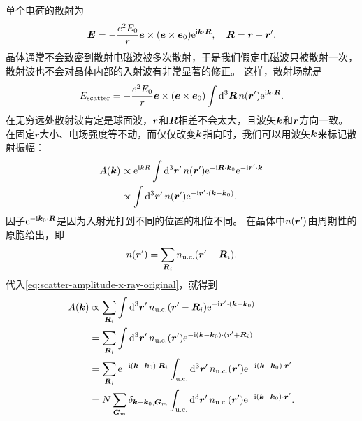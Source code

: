 单个电荷的散射为
\begin{equation}
    \vb*{E} = - \frac{e^2 E_0}{r} \vb*{e} \times (\vb*{e} \times \vb*{e}_0) \mathrm{e}^{\mathrm{i} \vb*{k} \cdot \vb*{R}}, \quad \vb*{R} = \vb*{r} - \vb*{r}'.
\end{equation}
晶体通常不会致密到散射电磁波被多次散射，于是我们假定电磁波只被散射一次，散射波也不会对晶体内部的入射波有非常显著的修正。
这样，散射场就是
\begin{equation}
    E_\text{scatter} = -\frac{e^2 E_0}{r} \vb*{e} \times (\vb*{e} \times \vb*{e}_0) \int \dd[3]{\vb*{R}} n(\vb*{r}') \mathrm{e}^{\mathrm{i} \vb*{k} \cdot \vb*{R}}.
\end{equation}
在无穷远处散射波肯定是球面波，$\vb*{r}$和$\vb*{R}$相差不会太大，且波矢$\vb*{k}$和$\vb*{r}$方向一致。
在固定$r$大小、电场强度等不动，而仅仅改变$\vb*{k}$指向时，我们可以用波矢$\vb*{k}$来标记散射振幅：
\begin{equation}
    \begin{aligned}
        A(\vb*{k}) &\propto \mathrm{e}^{\mathrm{i} k R} \int \dd[3]{\vb*{r}'} n(\vb*{r}') \mathrm{e}^{- \mathrm{i} \vb*{R} \cdot \vb*{k}_0} \mathrm{e}^{- \mathrm{i} \vb*{r}' \cdot \vb*{k}} \\
        &\propto \int \dd[3]{\vb*{r}'} n(\vb*{r}') \mathrm{e}^{- \mathrm{i} \vb*{r}' \cdot (\vb*{k} - \vb*{k}_0)}.
    \end{aligned}
    \label{eq:scatter-amplitude-x-ray-original}
\end{equation}
因子$\mathrm{e}^{- \mathrm{i} \vb*{k}_0 \cdot \vb*{R}}$是因为入射光打到不同的位置的相位不同。
在晶体中$n(\vb*{r}')$由周期性的原胞给出，即
\begin{equation}
    n(\vb*{r}') = \sum_{\vb*{R}_i} n_\text{u.c.}(\vb*{r}' - \vb*{R}_i),
\end{equation}
代入\eqref{eq:scatter-amplitude-x-ray-original}，就得到
\[
    \begin{aligned}
        A(\vb*{k}) &\propto \sum_{\vb*{R}_i} \int \dd[3]{\vb*{r}'} n_\text{u.c.}(\vb*{r}' - \vb*{R}_i) \mathrm{e}^{-\mathrm{i} \vb*{r}' \cdot (\vb*{k} - \vb*{k}_0)} \\
        &= \sum_{\vb*{R}_i} \int \dd[3]{\vb*{r}'} n_\text{u.c.}(\vb*{r}') \mathrm{e}^{-\mathrm{i} (\vb*{k} - \vb*{k}_0) \cdot (\vb*{r}' + \vb*{R}_i)} \\
        &= \sum_{\vb*{R}_i} \mathrm{e}^{-\mathrm{i} (\vb*{k} - \vb*{k}_0) \cdot \vb*{R}_i} \int_{\text{u.c.}} \dd[3]{\vb*{r}'} n_\text{u.c.}(\vb*{r}') \mathrm{e}^{-\mathrm{i} (\vb*{k} - \vb*{k}_0) \cdot \vb*{r}'} \\
        &= N \sum_{\vb*{G}_m} \delta_{\vb*{k}-\vb*{k}_0 ,\vb*{G}_m} \int_{\text{u.c.}} \dd[3]{\vb*{r}'} n_\text{u.c.}(\vb*{r}') \mathrm{e}^{-\mathrm{i} (\vb*{k} - \vb*{k}_0) \cdot \vb*{r}'}.
    \end{aligned}
\]

